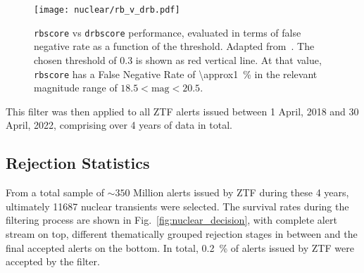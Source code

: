 \begin{figure}[htpb]
  \texttt{[image: nuclear/rb\_v\_drb.pdf]}
  \caption[\texttt{rbscore}/\texttt{drbscore} performance]{\texttt{rbscore} vs \texttt{drbscore} performance, evaluated in terms of false negative rate as a function of the threshold. Adapted from~\cite{Duev2019}. The chosen threshold of 0.3 is shown as red vertical line. At that value, \texttt{rbscore} has a False Negative Rate of \SI{\approx1}{\percent} in the relevant magnitude range of $18.5 < \text{mag} < 20.5$.}
\end{figure}

This filter was then applied to all ZTF alerts issued between 1 April, 2018 and 30 April, 2022, comprising over 4 years of data in total.

\subsection{Rejection Statistics}
From a total sample of $\sim 350$ Million alerts issued by ZTF during these 4 years, ultimately 11687 nuclear transients were selected. The survival rates during the filtering process are shown in Fig.~\ref{fig:nuclear_decision}, with complete alert stream on top, different thematically grouped rejection stages in between and the final accepted alerts on the bottom. In total, \SI{0.2}{\percent} of alerts issued by ZTF were accepted by the filter.

